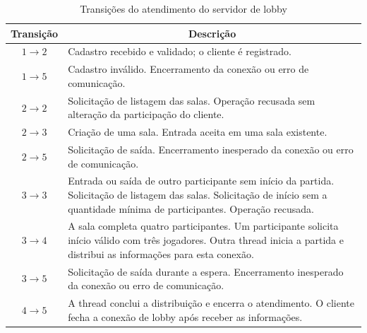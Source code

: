 \documentclass[11pt,a4paper]{article}
\begin{document}
\begin{table}[H]
    \centering
    \caption{Transições do atendimento do servidor de lobby}
    \label{tab:fsm_servidor_transicoes}
    \begin{tabular}{|c|p{11.7cm}|}
        \hline
        \textbf{Transição} &
        \multicolumn{1}{c|}{\textbf{Descrição}} \\ \hline

        $1 \rightarrow 2$ &
        Cadastro recebido e validado; o cliente é registrado. \\ \hline

        $1 \rightarrow 5$ &
        Cadastro inválido.
        \newline
        Encerramento da conexão ou erro de comunicação. \\ \hline

        $2 \rightarrow 2$ &
        Solicitação de listagem das salas.
        \newline
        Operação recusada sem alteração da participação do cliente. \\ \hline

        $2 \rightarrow 3$ &
        Criação de uma sala.
        \newline
        Entrada aceita em uma sala existente. \\ \hline

        $2 \rightarrow 5$ &
        Solicitação de saída.
        \newline
        Encerramento inesperado da conexão ou erro de comunicação. \\ \hline

        $3 \rightarrow 3$ &
        Entrada ou saída de outro participante sem início da partida.
        \newline
        Solicitação de listagem das salas.
        \newline
        Solicitação de início sem a quantidade mínima de participantes.
        \newline
        Operação recusada. \\ \hline

        $3 \rightarrow 4$ &
        A sala completa quatro participantes.
        \newline
        Um participante solicita início válido com três jogadores.
        \newline
        Outra thread inicia a partida e distribui as informações para esta conexão. \\ \hline

        $3 \rightarrow 5$ &
        Solicitação de saída durante a espera.
        \newline
        Encerramento inesperado da conexão ou erro de comunicação. \\ \hline

        $4 \rightarrow 5$ &
        A thread conclui a distribuição e encerra o atendimento.
        \newline
        O cliente fecha a conexão de lobby após receber as informações. \\ \hline
    \end{tabular}
\end{table}
\end{document}
